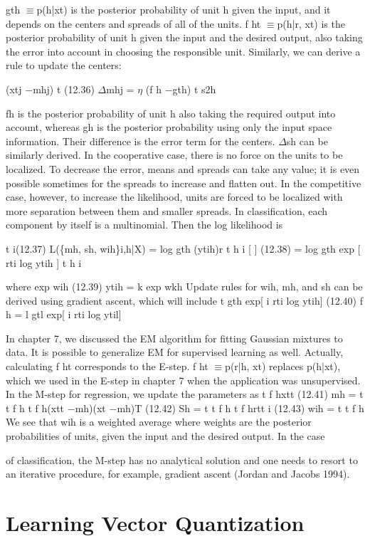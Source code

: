 gth $\equiv$p(h|xt) is the posterior probability of unit h given the input, and it depends on the centers and spreads of all of the units. f ht $\equiv$p(h|r, xt) is the posterior probability of unit h given the input and the desired output, also taking the error into account in choosing the responsible unit. Similarly, we can derive a rule to update the centers:

(xtj $-$mhj) t (12.36) $\Delta$mhj = $\eta$ (f h $-$gth) t s2h

fh is the posterior probability of unit h also taking the required output into account, whereas gh is the posterior probability using only the input space information. Their difference is the error term for the centers. $\Delta$sh can be similarly derived. In the cooperative case, there is no force on the units to be localized. To decrease the error, means and spreads can take any value; it is even possible sometimes for the spreads to increase and flatten out. In the competitive case, however, to increase the likelihood, units are forced to be localized with more separation between them and smaller spreads. In classification, each component by itself is a multinomial. Then the log likelihood is

t i(12.37) L(\{mh, sh, wih\}i,h|X) = log gth (ytih)r t h i [ ] (12.38) = log gth exp [ rti log ytih ] t h i

where exp wih (12.39) ytih = k exp wkh Update rules for wih, mh, and sh can be derived using gradient ascent, which will include t gth exp[ i rti log ytih] (12.40) f h = l gtl exp[ i rti log ytil]

In chapter 7, we discussed the EM algorithm for fitting Gaussian mixtures to data. It is possible to generalize EM for supervised learning as well. Actually, calculating f ht corresponds to the E-step. f ht $\equiv$p(r|h, xt) replaces p(h|xt), which we used in the E-step in chapter 7 when the application was unsupervised. In the M-step for regression, we update the parameters as t f hxtt (12.41) mh = t t f h t f h(xtt $-$mh)(xt $-$mh)T (12.42) Sh = t t f h t f hrtt i (12.43) wih = t t f h We see that wih is a weighted average where weights are the posterior probabilities of units, given the input and the desired output. In the case

of classification, the M-step has no analytical solution and one needs to resort to an iterative procedure, for example, gradient ascent (Jordan and Jacobs 1994).

\section{Learning Vector Quantization}

